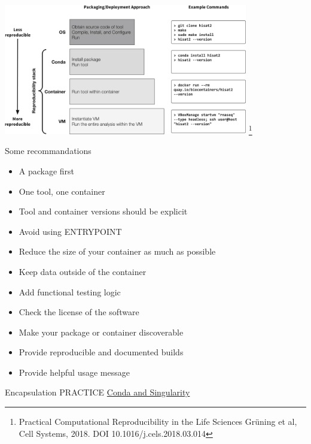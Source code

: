 \begin{frame}
\centering\includegraphics[width=0.8\textwidth]{images/reproductibility.jpg} \footnote{Practical Computational Reproducibility in the Life Sciences
Grüning et al, Cell Systems, 2018. DOI 10.1016/j.cels.2018.03.014}
\end{frame}
\begin{frame}[<+->]
Some recommandations 
\begin{itemize}
\item A package first
\item One tool, one container
\item Tool and container versions should be explicit
\item Avoid using ENTRYPOINT
\item Reduce the size of your container as much as possible
\item Keep data outside of the container
\item Add functional testing logic
\item Check the license of the software
\item Make your package or container discoverable
\item Provide reproducible and documented builds
\item Provide helpful usage message
\end{itemize}
\end{frame}

\begin{frame}
\begin{block}{Encapsulation PRACTICE}
\href{https://github.com/mesocentre-clermont-auvergne/formation_fair_2022/tree/main/fair_encapsulation/encapsulation_TP}{Conda and Singularity}

\end{block}
\end{frame}